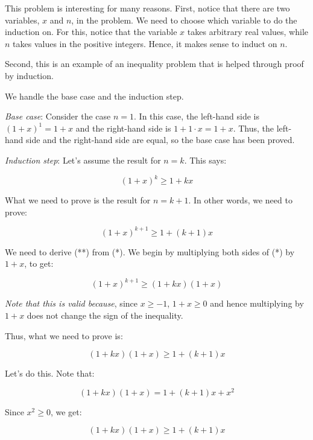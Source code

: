 \documentclass{amsart}
\begin{document}
This problem is interesting for many reasons. First, notice that there
are two variables, $x$ and $n$, in the problem. We need to choose
which variable to do the induction on. For this, notice that the
variable $x$ takes arbitrary real values, while $n$ takes values in
the positive integers. Hence, it makes sense to induct on $n$.

Second, this is an example of an inequality problem that is helped
through proof by induction.

We handle the base case and the induction step.

{\em Base case}: Consider the case $n = 1$. In this case, the
left-hand side is $(1 + x)^1 = 1 + x$ and the right-hand side is $1 +
1 \cdot x = 1 + x$. Thus, the left-hand side and the right-hand side
are equal, so the base case has been proved.

{\em Induction step}: Let's assume the result for $n = k$. This says:

\begin{equation*}
  (1 + x)^k \ge 1 + kx \tag{*}
\end{equation*}

What we need to prove is the result for $n = k + 1$. In other words,
we need to prove:

\begin{equation*}
  (1 + x)^{k + 1} \ge 1 + (k + 1)x \tag{**}
\end{equation*}

We need to derive (**) from (*). We begin by multiplying both
sides of (*) by $1 + x$, to get:

\begin{equation*}
  (1 + x)^{k + 1} \ge (1 + kx)(1 + x) \tag{***}
\end{equation*}

{\em Note that this is valid because}, since $x \ge -1$, $1 + x \ge 0$
and hence multiplying by $1 + x$ does not change the sign of the
inequality.

Thus, what we need to prove is:

\begin{equation*}
  (1 + kx)(1 + x) \ge 1 + (k + 1)x
\end{equation*}

Let's do this. Note that:

$$(1 + kx)(1 + x) = 1 + (k + 1)x + x^2$$

Since $x^2 \ge 0$, we get:

\begin{equation*}
  (1 + kx)(1 + x) \ge 1 + (k + 1)x \tag{****}
\end{equation*}
\end{document}
